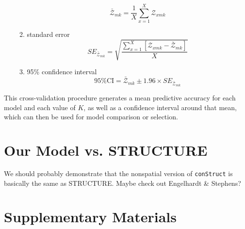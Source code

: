 \documentclass[12pt]{article}
\begin{document}
\begin{enumerate}
\begin{enumerate}
		\begin{equation}
			\bar{\mathcal{Z}}_{mk} = \frac{1}{X}\sum\limits_{x=1}^{X}\mathcal{Z}_{xmk}
		\end{equation}
	\item standard error
		\begin{equation}
			SE_{\bar{\mathcal{Z}}_{mk}} = \sqrt{\frac{\sum\limits_{x=1}^{X} \left[ {\mathcal{Z}_{xmk} - \bar{\mathcal{Z}}_{mk}} \right]}{X}}
		\end{equation}
	\item 95\% confidence interval
		\begin{equation}
			95\% \text{CI} = \bar{\mathcal{Z}}_{mk} \pm 1.96 \times SE_{\bar{\mathcal{Z}}_{mk}}
		\end{equation}
	\end{enumerate}
\end{enumerate}

This cross-validation procedure generates a mean predictive accuracy for each model and each value of $K$, 
as well as a confidence interval around that mean,
which can then be used for model comparison or selection.

\section{Our Model vs. STRUCTURE}
We should probably demonstrate that the nonspatial version of \texttt{conStruct} is basically the same as STRUCTURE.
Maybe check out Engelhardt \& Stephens?

\newpage
\section*{Supplementary Materials}
\renewcommand{\theequation}{S\arabic{equation}}
\setcounter{equation}{0}
\renewcommand{\thetable}{S\arabic{table}}
\setcounter{table}{0}
\renewcommand{\thefigure}{S\arabic{figure}}
\setcounter{figure}{0}
\end{document}

